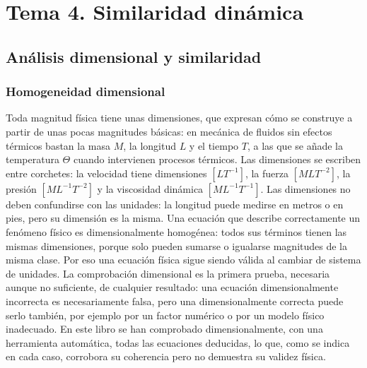 \documentclass[10pt,openany]{book}
\begin{document}
\part{Tema 4. Similaridad dinámica}

\chapter{Análisis dimensional y similaridad}
\label{chap:c10}


\section{Homogeneidad dimensional}

Toda magnitud física tiene unas dimensiones, que expresan cómo se construye a partir de unas pocas magnitudes básicas: en mecánica de fluidos sin efectos térmicos bastan la masa \(M\), la longitud \(L\) y el tiempo \(T\), a las que se añade la temperatura \(\Theta\) cuando intervienen procesos térmicos. Las dimensiones se escriben entre corchetes: la velocidad tiene dimensiones \([LT^{-1}]\), la fuerza \([MLT^{-2}]\), la presión \([ML^{-1}T^{-2}]\) y la viscosidad dinámica \([ML^{-1}T^{-1}]\). Las dimensiones no deben confundirse con las unidades: la longitud puede medirse en metros o en pies, pero su dimensión es la misma. Una ecuación que describe correctamente un fenómeno físico es dimensionalmente homogénea: todos sus términos tienen las mismas dimensiones, porque solo pueden sumarse o igualarse magnitudes de la misma clase. Por eso una ecuación física sigue siendo válida al cambiar de sistema de unidades. La comprobación dimensional es la primera prueba, necesaria aunque no suficiente, de cualquier resultado: una ecuación dimensionalmente incorrecta es necesariamente falsa, pero una dimensionalmente correcta puede serlo también, por ejemplo por un factor numérico o por un modelo físico inadecuado. En este libro se han comprobado dimensionalmente, con una herramienta automática, todas las ecuaciones deducidas, lo que, como se indica en cada caso, corrobora su coherencia pero no demuestra su validez física.
\end{document}
